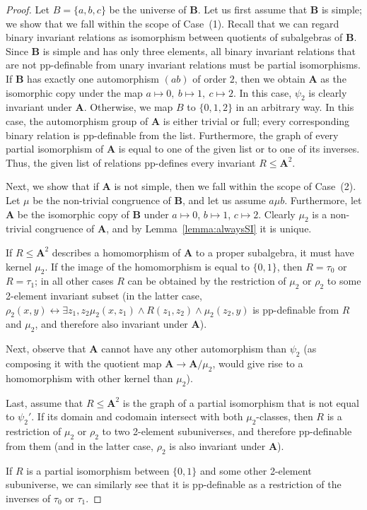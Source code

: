 \documentclass[12pt]{amsart}
\theoremstyle{definition}
\theoremstyle{definition}
\newcommand{\alg}[1]{\mathbf{#1}}
\newcommand{\algA}{\alg{A}}
\newcommand{\algB}{\alg{B}}
\begin{document}
\begin{proof}
Let $B = \{a,b,c\}$ be the universe of $\algB$. Let us first assume that $\algB$ is simple; we show that we fall within the scope of Case~(1). Recall that we can regard binary invariant relations as isomorphism between quotients of subalgebras of $\algB$. Since $\algB$ is simple and has only three elements, all binary invariant relations that are not pp-definable from unary invariant relations must be partial isomorphisms.
If $\algB$ has exactly one automorphism $(ab)$ of order $2$, then we obtain $\algA$ as the isomorphic copy under the map $a\mapsto 0,\ b\mapsto 1,\ c\mapsto 2$. In this case, $\psi_2$ is clearly invariant under $\algA$. Otherwise, we map $B$ to $\{0,1,2\}$ in an arbitrary way. In this case, the automorphism group of $\algA$ is either trivial or full; every corresponding binary relation is pp-definable from the list. Furthermore, the graph of every partial isomorphism of $\algA$ is equal to one of the given list or to one of its inverses. Thus, the given list of relations pp-defines every invariant $R\leq \algA^2$.

Next, we show that if $\mathbf{A}$ is not simple, then we fall within the scope of Case~(2). 
Let $\mu$ be the non-trivial congruence of $\algB$, and let us assume $a \mu b$. 
Furthermore, let $\alg{A}$ be the isomorphic copy of $\mathbf{B}$ under $a\mapsto 0$, $b\mapsto 1$, $c\mapsto 2$. 
Clearly $\mu_2$ is a non-trivial congruence of $\algA$, and by Lemma~\ref{lemma:alwaysSI} it is unique. 

If $R\leq \algA^2$ describes a homomorphism of $\algA$ to a proper subalgebra, it must have kernel $\mu_2$. If the image of the homomorphism is equal to $\{0,1\}$, then $R=\tau_0$ or $R=\tau_1$; in all other cases $R$ can be obtained by the restriction of $\mu_2$ or $\rho_2$ to some 2-element invariant subset (in the latter case, $\rho_2(x,y) \leftrightarrow \exists z_1,z_2 \mu_2(x,z_1) \land R(z_1,z_2)\land \mu_2(z_2,y)$ is pp-definable from $R$ and $\mu_2$, and therefore also invariant under $\algA$).

Next, observe that $\algA$ cannot have any other automorphism than $\psi_2$ (as composing it with the quotient map $\algA \to \algA/\mu_2$, would give rise to a homomorphism with other kernel than $\mu_2$).

Last, assume that $R \leq \algA^2$ is the graph of a partial isomorphism that is not equal to $\psi_2'$. If its domain and codomain intersect with both $\mu_2$-classes, then $R$ is a restriction of $\mu_2$ or $\rho_2$ to two 2-element subuniverses, and therefore pp-definable from them (and in the latter case, $\rho_2$ is also invariant under $\algA$). 

If $R$ is a partial isomorphism between $\{0,1\}$ and some other 2-element subuniverse, we can similarly see that it is pp-definable as a restriction of the inverses of $\tau_0$ or $\tau_1$.
\end{proof}
\end{document}
